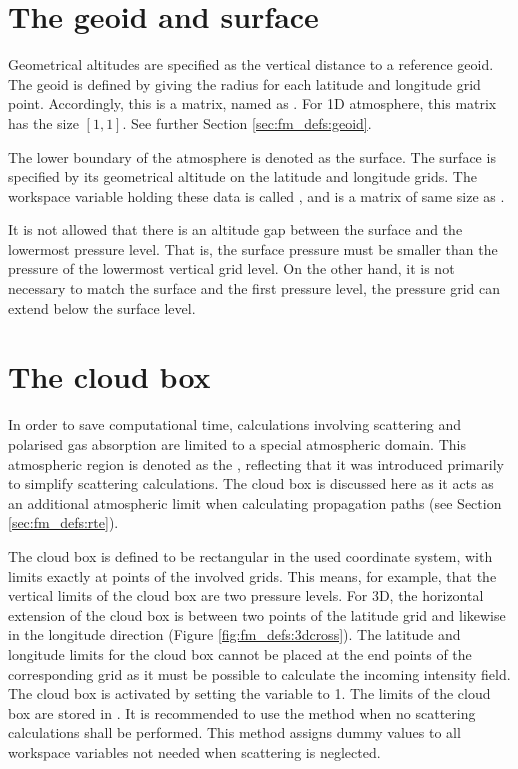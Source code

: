 \section{The geoid and surface}
\label{sec:fm_defs:surf}

Geometrical altitudes are specified as the vertical distance to a reference
geoid. The geoid is defined by giving the radius for each latitude and
longitude grid point. Accordingly, this is a matrix, named as
. For 1D atmosphere, this matrix has the size $[1,1]$.
See further Section \ref{sec:fm_defs:geoid}.

The lower boundary of the atmosphere is denoted as the surface. The surface is
specified by its geometrical altitude on the latitude and longitude grids.
The workspace variable holding these data is called , and
is a matrix of same size as .

It is not allowed that there is an altitude gap between the surface and
the lowermost pressure level.  That is, the surface pressure must be
smaller than the pressure of the lowermost vertical grid level. On
the other hand, it is not necessary to match the surface and the first
pressure level, the pressure grid can extend below the surface level.


\section{The cloud box}
\label{sec:fm_defs:cloudbox}
In order to save computational time, calculations involving scattering and
polarised gas absorption are limited to a special atmospheric domain. This
atmospheric region is denoted as the , reflecting that it
was introduced primarily to simplify scattering calculations. The cloud box is
discussed here as it acts as an additional atmospheric limit when calculating
propagation paths (see Section \ref{sec:fm_defs:rte}).

The cloud box is defined to be rectangular in the used coordinate
system, with limits exactly at points of the involved grids. This
means, for example, that the vertical limits of the cloud box are two
pressure levels. For 3D, the horizontal extension of the cloud box
is between two points of the latitude grid and likewise in the
longitude direction (Figure \ref{fig:fm_defs:3dcross}). The latitude
and longitude limits for the cloud box cannot be placed at the end
points of the corresponding grid as it must be possible to calculate
the incoming intensity field. The cloud box is activated by setting
the variable  to 1.  The limits of the cloud
box are stored in .  It is recommended to
use the method  when no scattering calculations
shall be performed. This method assigns dummy values to all workspace
variables not needed when scattering is neglected.

